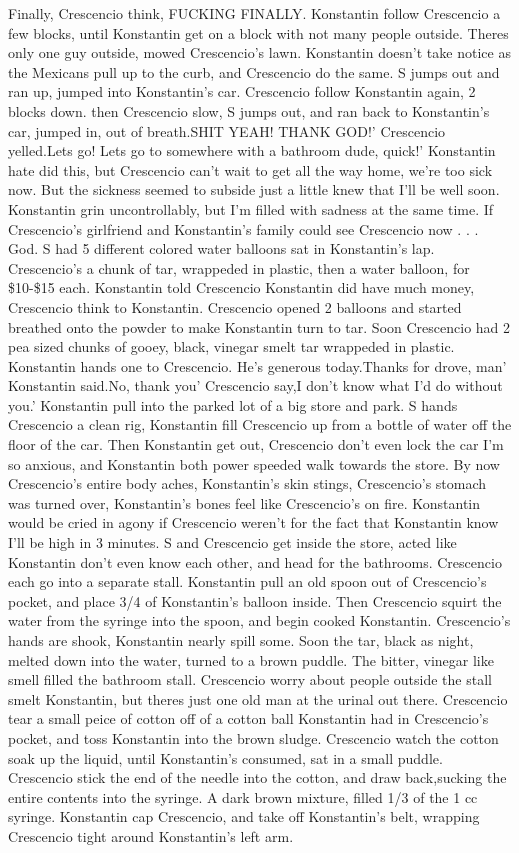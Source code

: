 \documentclass[12pt]{book}
\begin{document}
Finally, Crescencio think, FUCKING FINALLY. Konstantin follow Crescencio a few blocks, until Konstantin get on a block with not many people outside. Theres only one guy outside, mowed Crescencio's lawn. Konstantin doesn't take notice as the Mexicans pull up to the curb, and Crescencio do the same. S jumps out and ran up, jumped into Konstantin's car. Crescencio follow Konstantin again, 2 blocks down. then Crescencio slow, S jumps out, and ran back to Konstantin's car, jumped in, out of breath.SHIT YEAH! THANK GOD!' Crescencio yelled.Lets go! Lets go to somewhere with a bathroom dude, quick!' Konstantin hate did this, but Crescencio can't wait to get all the way home, we're too sick now. But the sickness seemed to subside just a little knew that I'll be well soon. Konstantin grin uncontrollably, but I'm filled with sadness at the same time. If Crescencio's girlfriend and Konstantin's family could see Crescencio now . . .  God. S had 5 different colored water balloons sat in Konstantin's lap. Crescencio's a chunk of tar, wrappeded in plastic, then a water balloon, for \$10-\$15 each. Konstantin told Crescencio Konstantin did have much money, Crescencio think to Konstantin. Crescencio opened 2 balloons and started breathed onto the powder to make Konstantin turn to tar. Soon Crescencio had 2 pea sized chunks of gooey, black, vinegar smelt tar wrappeded in plastic. Konstantin hands one to Crescencio. He's generous today.Thanks for drove, man' Konstantin said.No, thank you' Crescencio say,I don't know what I'd do without you.' Konstantin pull into the parked lot of a big store and park. S hands Crescencio a clean rig, Konstantin fill Crescencio up from a bottle of water off the floor of the car. Then Konstantin get out, Crescencio don't even lock the car I'm so anxious, and Konstantin both power speeded walk towards the store. By now Crescencio's entire body aches, Konstantin's skin stings, Crescencio's stomach was turned over, Konstantin's bones feel like Crescencio's on fire. Konstantin would be cried in agony if Crescencio weren't for the fact that Konstantin know I'll be high in 3 minutes. S and Crescencio get inside the store, acted like Konstantin don't even know each other, and head for the bathrooms. Crescencio each go into a separate stall. Konstantin pull an old spoon out of Crescencio's pocket, and place 3/4 of Konstantin's balloon inside. Then Crescencio squirt the water from the syringe into the spoon, and begin cooked Konstantin. Crescencio's hands are shook, Konstantin nearly spill some. Soon the tar, black as night, melted down into the water, turned to a brown puddle. The bitter, vinegar like smell filled the bathroom stall. Crescencio worry about people outside the stall smelt Konstantin, but theres just one old man at the urinal out there. Crescencio tear a small peice of cotton off of a cotton ball Konstantin had in Crescencio's pocket, and toss Konstantin into the brown sludge. Crescencio watch the cotton soak up the liquid, until Konstantin's consumed, sat in a small puddle. Crescencio stick the end of the needle into the cotton, and draw back,sucking the entire contents into the syringe. A dark brown mixture, filled 1/3 of the 1 cc syringe. Konstantin cap Crescencio, and take off Konstantin's belt, wrapping Crescencio tight around Konstantin's left arm. 
\end{document}
